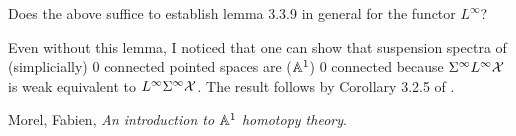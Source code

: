 \documentclass{amsart}%
\begin{document}
Does the above suffice to establish lemma 3.3.9 in general for the
functor $L^{\infty}$?

Even without this lemma, I noticed that one can show that suspension
spectra of (simplicially) $0$ connected pointed spaces are ($\mathbb{A}^1$)
$0$ connected because $\Sigma^{\infty}L^{\infty} \mathcal{X}$ is weak
equivalent to $L^{\infty}\Sigma^{\infty}\mathcal{X}$. The result follows by
Corollary 3.2.5 of \cite{Mor03}.


\begin{thebibliography}{OOOO}
     Morel, Fabien, {\it An introduction to $\mathbb{A}^1$
    homotopy theory}.



\end{thebibliography}
\end{document}
